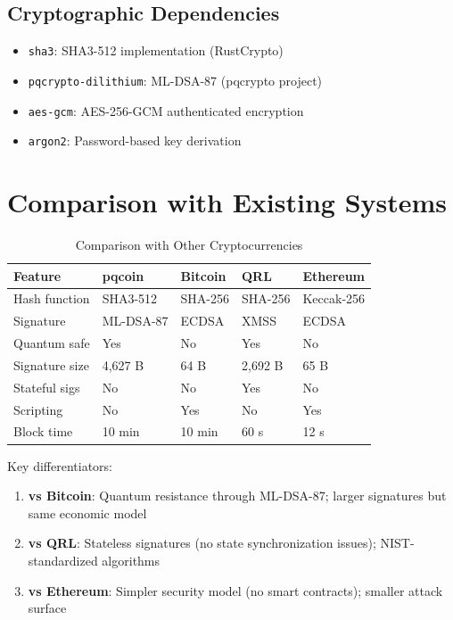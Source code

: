 \documentclass[11pt,a4paper]{article}
\begin{document}
\subsection{Cryptographic Dependencies}

\begin{itemize}
    \item \texttt{sha3}: SHA3-512 implementation (RustCrypto)
    \item \texttt{pqcrypto-dilithium}: ML-DSA-87 (pqcrypto project)
    \item \texttt{aes-gcm}: AES-256-GCM authenticated encryption
    \item \texttt{argon2}: Password-based key derivation
\end{itemize}

\section{Comparison with Existing Systems}

\begin{table}[h]
\centering
\caption{Comparison with Other Cryptocurrencies}
\label{tab:comparison}
\begin{tabular}{@{}lllll@{}}
\toprule
Feature & pqcoin & Bitcoin & QRL & Ethereum \\
\midrule
Hash function & SHA3-512 & SHA-256 & SHA-256 & Keccak-256 \\
Signature & ML-DSA-87 & ECDSA & XMSS & ECDSA \\
Quantum safe & Yes & No & Yes & No \\
Signature size & 4,627 B & 64 B & 2,692 B & 65 B \\
Stateful sigs & No & No & Yes & No \\
Scripting & No & Yes & No & Yes \\
Block time & 10 min & 10 min & 60 s & 12 s \\
\bottomrule
\end{tabular}
\end{table}

Key differentiators:

\begin{enumerate}
    \item \textbf{vs Bitcoin}: Quantum resistance through ML-DSA-87; larger signatures but same economic model
    \item \textbf{vs QRL}: Stateless signatures (no state synchronization issues); NIST-standardized algorithms
    \item \textbf{vs Ethereum}: Simpler security model (no smart contracts); smaller attack surface
\end{enumerate}
\end{document}
